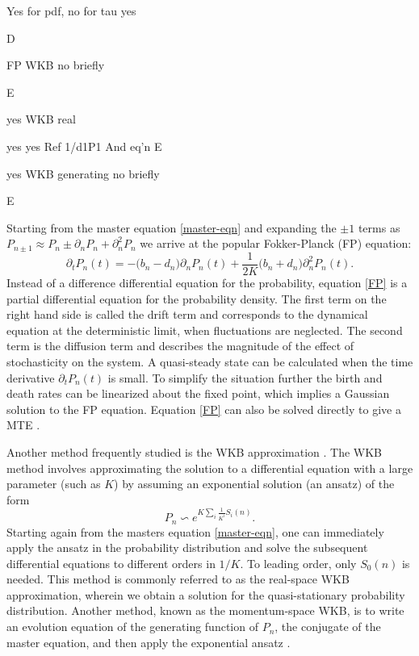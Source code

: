 Yes for pdf, no for tau
yes


D




FP WKB
no
briefly


E


yes
WKB real


yes
yes
Ref 1/d1P1
And eq’n
E


yes
WKB generating
no
briefly


E




\fi
Starting from the master equation \ref{master-eqn} and expanding the $\pm 1$ terms as $P_{n\pm 1} \approx P_n \pm \partial_n P_n + \partial^2_n P_n$ we arrive at the popular Fokker-Planck (FP) equation:
\begin{equation}
\partial_t P_n(t) = - \Big( b_n - d_n \Big) \partial_n P_n(t) + \frac{1}{2 K} \Big( b_n + d_n \Big) \partial_n^2 P_n(t).  \label{FP}
\end{equation}
Instead of a difference differential equation for the probability, equation \ref{FP} is a partial differential equation for the probability density.
The first term on the right hand side is called the drift term and corresponds to the dynamical equation at the deterministic limit, when fluctuations are neglected.
The second term is the diffusion term and describes the magnitude of the effect of stochasticity on the system.
A quasi-steady state can be calculated when the time derivative $\partial_t P_n(t)$ is small.
To simplify the situation further the birth and death rates can be linearized about the fixed point, which implies a Gaussian solution to the FP equation.
Equation \ref{FP} can also be solved directly to give a MTE \cite{Gardiner2004}.

Another method frequently studied is the WKB approximation \cite{}.
The WKB method involves approximating the solution to a differential equation with a large parameter (such as $K$) by assuming an exponential solution (an ansatz) of the form
\begin{equation}
P_n \backsim e^{K\sum_i \frac{1}{K^i}S_i(n)}.
\label{ansatz}
\end{equation}
Starting again from the masters equation \ref{master-eqn}, one can immediately apply the ansatz in the probability distribution and solve the subsequent differential equations to different orders in $1/K$\cite{Assaf2016,etc}.%
To leading order, only $S_0(n)$ is needed.
This method is commonly referred to as the real-space WKB approximation, wherein we obtain a solution for the quasi-stationary probability distribution.
Another method, known as the momentum-space WKB, is to write an evolution equation of the generating function of $P_n$, the conjugate of the master equation, and then apply the exponential ansatz \cite{Generating function stuff}.


